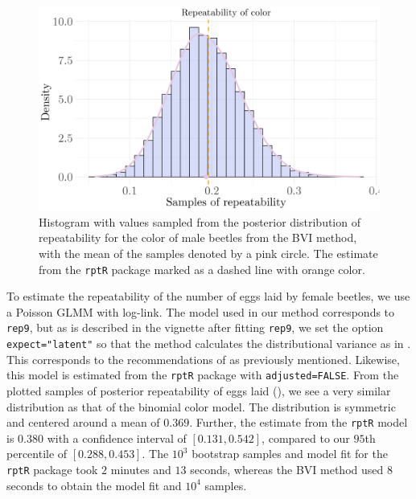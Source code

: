 \begin{figure}[H]
  \centering
  \includegraphics[width=1\linewidth]{Figures/Stoffel Comparison/Heritability_colour_Binomial.png}
  \caption[Estimated repeatability of color in male beetles]{Histogram with values sampled from the posterior distribution of repeatability for the color of male beetles from the BVI method, with the mean of the samples denoted by a pink circle. The estimate from the \texttt{rptR} package marked as a dashed line with orange color.}
  \label{fig:heritability_colour_Binomial}
\end{figure}
\noindent To estimate the repeatability of the number of eggs laid by female beetles, we use a Poisson GLMM with log-link. The model used in our method corresponds to \texttt{rep9}, but as is described in the vignette after fitting \texttt{rep9}, we set the option \texttt{expect="latent"} so that the method calculates the distributional variance as in . This corresponds to the recommendations of \citet{nakagawa2017} as previously mentioned. Likewise, this model is estimated from the \texttt{rptR} package with \texttt{adjusted=FALSE}. From the plotted samples of posterior repeatability of eggs laid (), we see a very similar distribution as that of the binomial color model. The distribution is symmetric and centered around a mean of $0.369$. Further, the estimate from the \texttt{rptR} model is $0.380$ with a confidence interval of $[0.131, 0.542]$, compared to our $95$th percentile of $[0.288, 0.453]$. The $10^3$ bootstrap samples and model fit for the \texttt{rptR} package took $2$ minutes and $13$ seconds, whereas the BVI method used $8$ seconds to obtain the model fit and $10^4$ samples.
